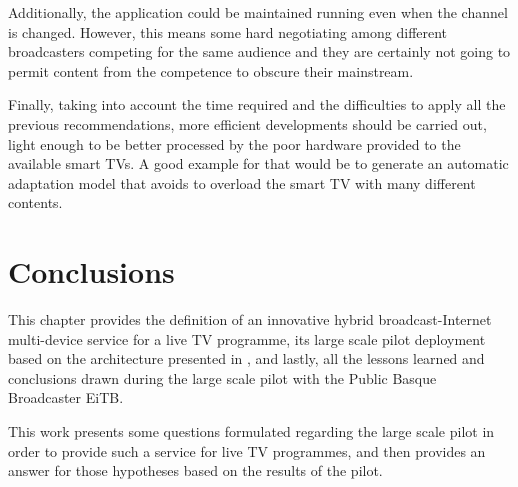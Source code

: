 Additionally, the application could be maintained running even when the channel is changed. However, this means some hard negotiating among different broadcasters competing for the same audience and they are certainly not going to permit content from the competence to obscure their mainstream. 

Finally, taking into account the time required and the difficulties to apply all the previous recommendations, more efficient developments should be carried out, light enough to be better processed by the poor hardware provided to the available smart TVs. A good example for that would be to generate an automatic adaptation model that avoids to overload the smart TV with many different contents. 

\section{Conclusions}\label{conclusions}
This chapter provides the definition of an innovative hybrid broadcast-Internet multi-device service for a live TV programme, its large scale pilot deployment based on the architecture presented in \cite{Zorrilla2015}, and lastly, all the lessons learned and conclusions drawn during the large scale pilot with the Public Basque Broadcaster EiTB.

This work presents some questions formulated regarding the large scale pilot in order to provide such a service for live TV programmes, and then provides an answer for those hypotheses based on the results of the pilot.

